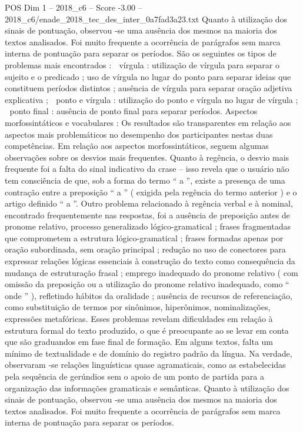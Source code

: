 \begin{textsample}{POS Dim 1 – 2018\_c6 – Score -3.00 – 2018\_c6/enade\_2018\_tec\_des\_inter\_0a7fad3a23.txt}
Quanto à utilização dos sinais de pontuação, observou -se uma ausência dos mesmos na maioria dos textos analisados.
Foi muito frequente a ocorrência de parágrafos sem marca interna de pontuação para separar os períodos.
São os seguintes os tipos de problemas mais encontrados :  vírgula : utilização de vírgula para separar o sujeito e o predicado ; uso de vírgula no lugar do ponto para separar ideias que constituem períodos distintos ; ausência de vírgula para separar oração adjetiva explicativa ;  ponto e vírgula : utilização do ponto e vírgula no lugar de vírgula ;  ponto final : ausência de ponto final para separar períodos.
Aspectos morfossintáticos e vocabulares : Os resultados são transparentes em relação aos aspectos mais problemáticos no desempenho dos participantes nestas duas competências.
Em relação aos aspectos morfossintáticos, seguem algumas observações sobre os desvios mais frequentes.
Quanto à regência, o desvio mais frequente foi a falta do sinal indicativo da crase – isso revela que o usuário não tem consciência de que, sob a forma do termo “ a ”, existe a presença de uma contração entre a preposição “ a ” ( exigida pela regência do termo anterior ) e o artigo definido “ a ”.
Outro problema relacionado à regência verbal e à nominal, encontrado frequentemente nas respostas, foi a ausência de preposição antes de pronome relativo, processo generalizado lógico-gramatical ; frases fragmentadas que comprometem a estrutura lógico-gramatical ; frases formadas apenas por oração subordinada, sem oração principal ; redução no uso de conectores para expressar relações lógicas essenciais à construção do texto como consequência da mudança de estruturação frasal ; emprego inadequado do pronome relativo ( com omissão da preposição ou a utilização do pronome relativo inadequado, como “ onde ” ), refletindo hábitos da oralidade ; ausência de recursos de referenciação, como substituição de termos por sinônimos, hiperônimos, nominalizações, expressões metafóricas.
Esses problemas revelam dificuldades em relação à estrutura formal do texto produzido, o que é preocupante ao se levar em conta que são graduandos em fase final de formação.
Em alguns textos, falta um mínimo de textualidade e de domínio do registro padrão da língua.
Na verdade, observaram -se relações linguísticas quase agramaticais, como as estabelecidas pela sequência de gerúndios sem o apoio de um ponto de partida para a organização das informações gramaticais e semânticas.
Quanto à utilização dos sinais de pontuação, observou -se uma ausência dos mesmos na maioria dos textos analisados.
Foi muito frequente a ocorrência de parágrafos sem marca interna de pontuação para separar os períodos.

\end{textsample}
